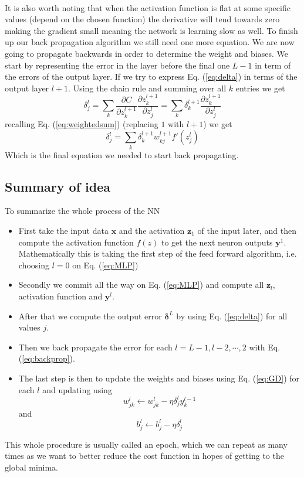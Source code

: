 \documentclass[14pt, a4paper]{book}
\begin{document}
\\It is also worth noting that when the activation function is flat at some specific values (depend on the chosen function) the derivative will tend towards zero making the gradient small meaning the network is learning slow as well. To finish up our back propagation algorithm we still need one more equation. We are now going to propagate backwards in order to determine the weight and biases. We start by representing the error in the layer before the final one $L-1$ in term of the errors of the output layer. If we try to express Eq. (\ref{eq:delta}) in terms of the output layer $l+1$. Using the chain rule and summing over all $k$ entries we get
$$
\delta_j^l=\sum_k\frac{\partial C}{\partial z_k^{l+1}}\frac{\partial z_k^{l+1}}{\partial z_j^l} =\sum_k \delta_k^{l+1}\frac{\partial z_k^{l+1}}{\partial z_j^l}
$$
recalling Eq. (\ref{eq:weightedsum}) (replacing $1$ with $l+1$) we get
\begin{equation}\label{eq:backprop}
    \delta_j^l=\sum_k\delta_k^{l+1}w_{kj}^{l+1}f'(z_j^l)
\end{equation}
Which is the final equation we needed to start back propagating. 

\subsection{Summary of idea}
To summarize the whole process of the NN
\begin{itemize}
    \item First take the input data $\mathbf{x}$ and the activation $\mathbf{z}_1$ of the input later, and then compute the activation function $f(z)$ to get the next neuron outputs $\mathbf{y}^1$. Mathematically this is taking the first step of the feed forward algorithm, i.e. choosing $l=0$ on Eq. (\ref{eq:MLP})
    \item Secondly we commit all the way on Eq. (\ref{eq:MLP}) and compute all $\mathbf{z}_l$, activation function and $\mathbf{y}^l$.
    \item After that we compute the output error $\bm{\delta}^L$ by using Eq. (\ref{eq:delta}) for all values $j$.
    \item Then we back propagate the error for each $l=L-1,l-2,\cdots,2$ with Eq. (\ref{eq:backprop}).
    \item The last step is then to update the weights and biases using Eq. (\ref{eq:GD}) for each $l$ and updating using
    $$
    w_{jk}^l\leftarrow w_{jk}^l-\eta\delta_j^ly_k^{l-1}
    $$
    and
    $$
    b_j^l \leftarrow b_j^l-\eta\delta_j^l
    $$
\end{itemize}
This whole procedure is usually called an epoch, which we can repeat as many times as we want to better reduce the cost function in hopes of getting to the global minima.
\end{document}
